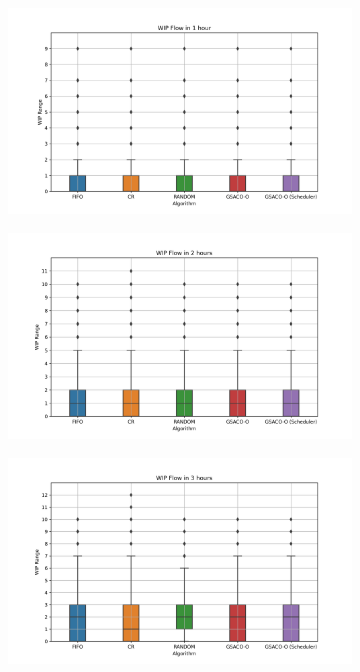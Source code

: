 \begin{figure}[t]
	\centering
	\begin{subfigure}[b]{0.32\textwidth}
		\includegraphics[width=\textwidth]{HVLM/new_period_3600s.png}
	\end{subfigure}
	\hfill
	\begin{subfigure}[b]{0.32\textwidth}
		\includegraphics[width=\textwidth]{HVLM/new_period_7200s.png}
	\end{subfigure}
	\hfill
	\begin{subfigure}[b]{0.32\textwidth}
		\includegraphics[width=\textwidth]{HVLM/new_period_10800s.png}
	\end{subfigure}
	

\end{figure}
